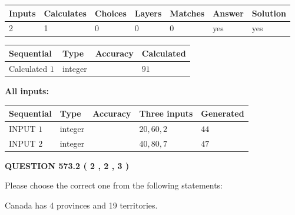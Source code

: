\documentclass[12pt]{article}
\begin{document}
 

 
   
   
   
   
\noindent\begin{tabular}{|l|l|l|l|l|l|l|}
 \hline
Inputs & Calculates & Choices & Layers & Matches & Answer & Solution \\ \hline
 2  & 
 1  & 
 0
  & 
 0  & 
 0  & 
  yes & 
  yes 
  \\ \hline
 \end{tabular}
   
   
   
   
\noindent{}
   
   
  
  
\noindent\begin{tabular}{|l|l|l|l|}
\hline
 Sequential & Type & Accuracy & Calculated \\ 
\hline
 
 
  Calculated $  1 $ & integer &  & 
  $ 91 $ 
 \\  \hline  
 \end{tabular}
   
   
   
   
\noindent\vspace{0.1in}\hspace{-0.08in} {\textbf{\Large{All inputs: }}}
   
   
  
  
\noindent\begin{tabular}{|l|l|l|l|l|}
\hline
 Sequential & Type & Accuracy & Three inputs & Generated \\ 
\hline
 
 
  INPUT $  1 $ & integer &  & $
 20
 , 
 60
 , 
 2
 $ & $ 44 $ 
 \\  \hline  
 
 
  INPUT $  2 $ & integer &  & $
 40
 , 
 80
 , 
 7
 $ & $ 47 $ 
 \\  \hline  
 \end{tabular}
   
   
  
\vspace{0.2in}
  
{\textbf{\Large{QUESTION
573.2 
 ( 2 , 2 , 3 )
}}}
  
  
Please choose the correct one from the following statements:
 
 
Canada has   4 provinces and  19 territories.
 
\end{document}
